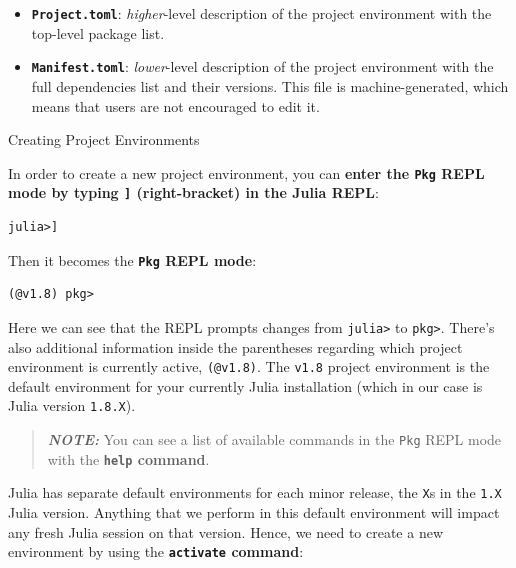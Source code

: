 \documentclass[
  notoc %
]{tufte-book}
\makeatletter
\providecommand{\tightlist}{%
  \setlength{\itemsep}{0pt}\setlength{\parskip}{0pt}
}
\newcommand{\passthrough}[1]{#1}
\renewcommand\subsubsection{%
\@startsection{subsubsection}{3}{\z@ }{-3.25ex\@plus -1ex \@minus -.2ex}{1.5ex \@plus .2ex}{\normalfont \normalsize \bfseries }
}
\makeatother
\begin{document}
\begin{itemize}
\tightlist
\item
  \textbf{\passthrough{\lstinline!Project.toml!}}: \emph{higher}-level
  description of the project environment with the top-level package
  list.
\item
  \textbf{\passthrough{\lstinline!Manifest.toml!}}: \emph{lower}-level
  description of the project environment with the full dependencies list
  and their versions. This file is machine-generated, which means that
  users are not encouraged to edit it.
\end{itemize}

\hypertarget{sec:project_management_creating}{%
\subsubsection{Creating Project
Environments}\label{sec:project_management_creating}}

In order to create a new project environment, you can \textbf{enter the
\passthrough{\lstinline!Pkg!} REPL mode by typing
\passthrough{\lstinline!]!} (right-bracket) in the Julia REPL}:

\begin{lstlisting}
julia>]
\end{lstlisting}

Then it becomes the \textbf{\passthrough{\lstinline!Pkg!} REPL mode}:

\begin{lstlisting}
(@v1.8) pkg>
\end{lstlisting}

Here we can see that the REPL prompts changes from
\passthrough{\lstinline!julia>!} to \passthrough{\lstinline!pkg>!}.
There's also additional information inside the parentheses regarding
which project environment is currently active,
\passthrough{\lstinline!(@v1.8)!}. The \passthrough{\lstinline!v1.8!}
project environment is the default environment for your currently Julia
installation (which in our case is Julia version
\passthrough{\lstinline!1.8.X!}).

\begin{quote}
\textbf{\emph{NOTE:}} You can see a list of available commands in the
\passthrough{\lstinline!Pkg!} REPL mode with the
\textbf{\passthrough{\lstinline!help!} command}.
\end{quote}

Julia has separate default environments for each minor release, the
\passthrough{\lstinline!X!}s in the \passthrough{\lstinline!1.X!} Julia
version. Anything that we perform in this default environment will
impact any fresh Julia session on that version. Hence, we need to create
a new environment by using the
\textbf{\passthrough{\lstinline!activate!} command}:
\end{document}
